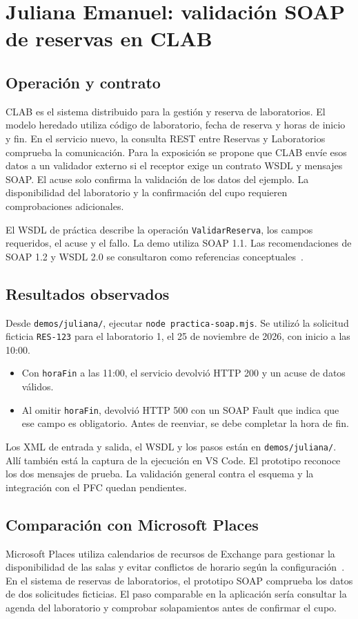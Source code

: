 \documentclass[10pt,a4paper,twocolumn]{article}
\begin{document}
\section{Juliana Emanuel: validación SOAP de reservas en CLAB}

\subsection{Operación y contrato}
CLAB es el sistema distribuido para la gestión y reserva de laboratorios. El modelo heredado utiliza código de laboratorio, fecha de reserva y horas de inicio y fin. En el servicio nuevo, la consulta REST entre Reservas y Laboratorios comprueba la comunicación. Para la exposición se propone que CLAB envíe esos datos a un validador externo si el receptor exige un contrato WSDL y mensajes SOAP. El acuse solo confirma la validación de los datos del ejemplo. La disponibilidad del laboratorio y la confirmación del cupo requieren comprobaciones adicionales.

El WSDL de práctica describe la operación \texttt{ValidarReserva}, los campos requeridos, el acuse y el fallo. La demo utiliza SOAP 1.1. Las recomendaciones de SOAP 1.2 y WSDL 2.0 se consultaron como referencias conceptuales~\cite{w3c-soap12-juliana,w3c-wsdl20-juliana}.

\subsection{Resultados observados}
Desde \texttt{demos/juliana/}, ejecutar \texttt{node practica-soap.mjs}. Se utilizó la solicitud ficticia \texttt{RES-123} para el laboratorio 1, el 25 de noviembre de 2026, con inicio a las 10:00.
\begin{itemize}
  \item Con \texttt{horaFin} a las 11:00, el servicio devolvió HTTP 200 y un acuse de datos válidos.
  \item Al omitir \texttt{horaFin}, devolvió HTTP 500 con un SOAP Fault que indica que ese campo es obligatorio. Antes de reenviar, se debe completar la hora de fin.
\end{itemize}
Los XML de entrada y salida, el WSDL y los pasos están en \texttt{demos/juliana/}. Allí también está la captura de la ejecución en VS Code. El prototipo reconoce los dos mensajes de prueba. La validación general contra el esquema y la integración con el PFC quedan pendientes.

\subsection{Comparación con Microsoft Places}
Microsoft Places utiliza calendarios de recursos de Exchange para gestionar la disponibilidad de las salas y evitar conflictos de horario según la configuración~\cite{microsoft-places-salas-2026}. En el sistema de reservas de laboratorios, el prototipo SOAP comprueba los datos de dos solicitudes ficticias. El paso comparable en la aplicación sería consultar la agenda del laboratorio y comprobar solapamientos antes de confirmar el cupo.
\end{document}
